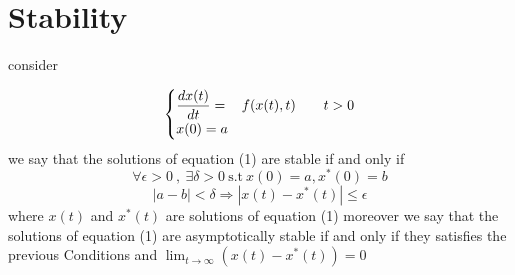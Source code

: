 \documentclass[]{article}
\begin{document}
\section{Stability}

consider 

\begin{equation}
    \begin{cases}
        \displaystyle \frac{dx(t)}{dt} = &f(x(t),t) \quad\quad t>0
        \\
        x(0) = a
    \end{cases}
\end{equation}
we say that the solutions of equation (1) are stable if and only if
\[
\forall \epsilon >0 \  , \ \exists \delta >0 \ \text{s.t} \  x(0)=a , x^*(0)=b 
\]\[
\left\lvert a-b \right\rvert < \delta \Longrightarrow  
\left\lvert x(t) - x^*(t) \right\rvert \leq \epsilon
\]
where $x(t)$ and $x^*(t)$ are solutions of equation (1) moreover we 
say that the solutions of equation (1) are asymptotically stable if and only if they 
satisfies the previous Conditions and $\displaystyle \lim_{t \to \infty} (x(t) - x^*(t)) = 0$
\end{document}
